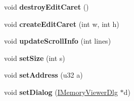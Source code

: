 \begin{DoxyCompactItemize}
void {\bfseries destroy\+Edit\+Caret} ()
\item 
\mbox{\label{class_memory_viewer_a73ddaf427846eedb7073ad6fc69001ac}} 
void {\bfseries create\+Edit\+Caret} (int w, int h)
\item 
\mbox{\label{class_memory_viewer_aa133e5db4bf989efa18892de371c0f43}} 
void {\bfseries update\+Scroll\+Info} (int lines)
\item 
\mbox{\label{class_memory_viewer_a185cb06e604ff1e0016b9be859c21387}} 
void {\bfseries set\+Size} (int s)
\item 
\mbox{\label{class_memory_viewer_abe391051455e116889da0613c19888a2}} 
void {\bfseries set\+Address} (u32 a)
\item 
\mbox{\label{class_memory_viewer_a546b937c21dfa976c99dc1891569e503}} 
void {\bfseries set\+Dialog} (\mbox{\hyperlink{class_i_memory_viewer_dlg}{I\+Memory\+Viewer\+Dlg}} $\ast$d)
\end{DoxyCompactItemize}
